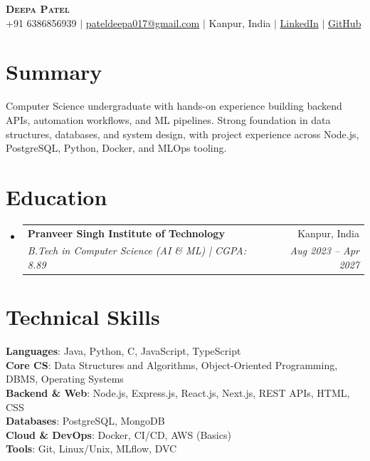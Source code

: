 \documentclass[a4paper,11pt]{article}
\makeatletter
\newcommand{\resumeSubheading}[4]{
  \item
  \begin{tabular*}{\textwidth}{l@{\extracolsep{\fill}}r}
    \textbf{#1} & #2 \\
    \textit{\small #3} & \textit{\small #4}
  \end{tabular*}\vspace{-5pt}
}
\makeatother
\begin{document}
\begin{center}
  \textbf{\Huge \scshape Deepa Patel} \\ \vspace{2pt}
  \small
  +91 6386856939 $|$
  \href{mailto:pateldeepa017@gmail.com}{pateldeepa017@gmail.com} $|$
  Kanpur, India $|$
  \href{https://www.linkedin.com/in/deepa-patel-71678b293/}{LinkedIn} $|$
  \href{https://github.com/D-393Patel}{GitHub}
\end{center}

\section{Summary}
\begin{itemize}[leftmargin=0.15in,label={}]
\small{
\item Computer Science undergraduate with hands-on experience building backend APIs, automation workflows, and ML pipelines. Strong foundation in data structures, databases, and system design, with project experience across Node.js, PostgreSQL, Python, Docker, and MLOps tooling.
}
\end{itemize}

\section{Education}
\begin{itemize}[leftmargin=0.15in,label={}]
\resumeSubheading
{Pranveer Singh Institute of Technology}{Kanpur, India}
{B.Tech in Computer Science (AI \& ML) \;|\; CGPA: 8.89}{Aug 2023 -- Apr 2027}
\end{itemize}

\section{Technical Skills}
\small
\textbf{Languages}: Java, Python, C, JavaScript, TypeScript \\
\textbf{Core CS}: Data Structures and Algorithms, Object-Oriented Programming, DBMS, Operating Systems \\
\textbf{Backend \& Web}: Node.js, Express.js, React.js, Next.js, REST APIs, HTML, CSS \\
\textbf{Databases}: PostgreSQL, MongoDB \\
\textbf{Cloud \& DevOps}: Docker, CI/CD, AWS (Basics) \\
\textbf{Tools}: Git, Linux/Unix, MLflow, DVC
\end{document}
